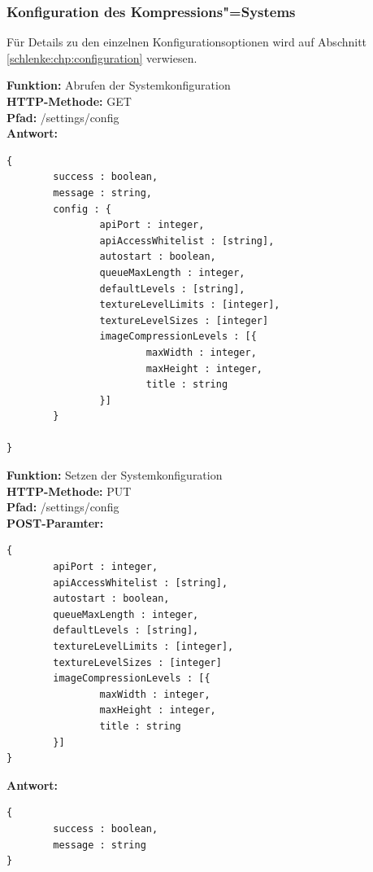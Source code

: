\subsubsection{Konfiguration des Kompressions"=Systems}

Für Details zu den einzelnen Konfigurationsoptionen wird auf Abschnitt \ref{schlenke:chp:configuration} verwiesen.

\noindent\textbf{Funktion: }Abrufen der Systemkonfiguration \\
\textbf{HTTP-Methode: } {\ttfamily GET} \\
\textbf{Pfad: } {\ttfamily /settings/config} \\
\textbf{Antwort: }
\begin{lstlisting}[caption={Antwort auf das Abrufen der Systemkonfiguration}]
{
		success : boolean,
		message : string,
		config : {
				apiPort : integer,
				apiAccessWhitelist : [string],
				autostart : boolean,
				queueMaxLength : integer,
				defaultLevels : [string],
				textureLevelLimits : [integer],
				textureLevelSizes : [integer]
				imageCompressionLevels : [{
						maxWidth : integer,
						maxHeight : integer,
						title : string
				}]
		}
		
}
\end{lstlisting}

\noindent\textbf{Funktion: }Setzen der Systemkonfiguration \\
\textbf{HTTP-Methode: } {\ttfamily PUT} \\
\textbf{Pfad: } {\ttfamily /settings/config} \\
\textbf{POST-Paramter: } 
\begin{lstlisting}[caption={POST-Parameter zum Setzen der Systemkonfiguration}]
{
		apiPort : integer,
		apiAccessWhitelist : [string],
		autostart : boolean,
		queueMaxLength : integer,
		defaultLevels : [string],
		textureLevelLimits : [integer],
		textureLevelSizes : [integer]
		imageCompressionLevels : [{
				maxWidth : integer,
				maxHeight : integer,
				title : string
		}]
}
\end{lstlisting}
\textbf{Antwort: }
\begin{lstlisting}[caption={Antwort auf das Setzen der Systemkonfiguration}]
{
		success : boolean,
		message : string
}
\end{lstlisting}




